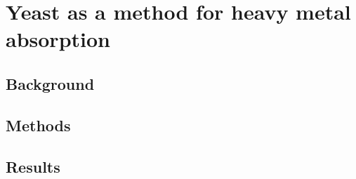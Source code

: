 \documentclass[../main/main]{subfiles}
\begin{document}
\chapter{Yeast as a method for heavy metal absorption}

\section{Background}

\section{Methods}

\section{Results}
\end{document}
